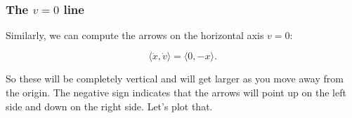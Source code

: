 \documentclass[11pt]{article}
\begin{document}
    \begin{center}
    \end{center}
    { \hspace*{\fill} \\}
    
    \subsubsection{\texorpdfstring{The \(v=0\)
line}{The v=0 line}}\label{the-v0-line}

Similarly, we can compute the arrows on the horizontal axis \(v=0\):

\[\langle \dot{x}, \dot{v} \rangle = \langle 0,-x \rangle.\]

So these will be completely vertical and will get larger as you move
away from the origin. The negative sign indicates that the arrows will
point up on the left side and down on the right side. Let's plot that.
\end{document}
